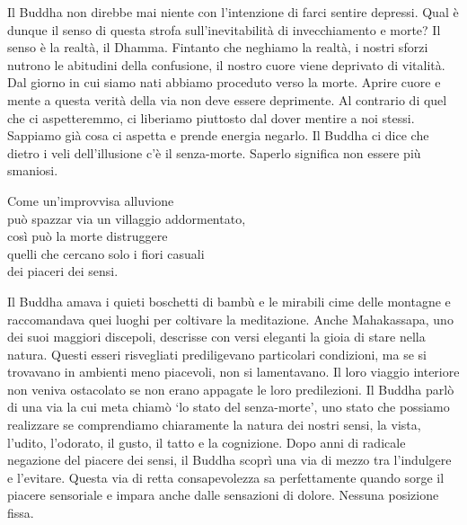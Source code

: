 \begin{dhpRefl}
Il Buddha non direbbe mai niente con l'intenzione di farci sentire depressi. Qual \`{e} dunque il senso di questa strofa sull'inevitabilit\`{a} di invecchiamento e morte? Il senso \`{e} la realt\`{a}, il Dhamma. Fintanto che neghiamo la realt\`{a}, i nostri sforzi nutrono le abitudini della confusione, il nostro cuore viene deprivato di vitalit\`{a}. Dal giorno in cui siamo nati abbiamo proceduto  verso la morte. Aprire cuore e mente a questa verit\`{a} della via non deve essere deprimente. Al contrario di quel che ci aspetteremmo,  ci liberiamo piuttosto dal dover mentire a noi stessi. Sappiamo gi\`{a} cosa ci aspetta e prende energia negarlo. Il Buddha ci dice che dietro i veli dell'illusione c'\`{e} il senza-morte. Saperlo significa non essere più smaniosi.
\end{dhpRefl}


\begin{dhpVerse}{47}
\label{dhp-47}
Come un'improvvisa alluvione\\
pu\`{o} spazzar via un villaggio addormentato,\\
così pu\`{o} la morte distruggere\\
quelli che cercano solo i fiori casuali\\
dei piaceri dei sensi.
\end{dhpVerse}

\begin{dhpRefl}
Il Buddha amava i quieti boschetti di bambù e le mirabili cime delle montagne e raccomandava quei luoghi per coltivare la meditazione. Anche Mahakassapa, uno dei suoi maggiori discepoli, descrisse con versi eleganti la gioia di stare nella natura. Questi esseri risvegliati prediligevano particolari condizioni, ma se si trovavano in ambienti meno piacevoli, non si lamentavano. Il loro viaggio interiore non veniva ostacolato se non erano appagate le loro predilezioni. Il Buddha parl\`{o} di una via la cui meta chiam\`{o} `lo stato del senza-morte', uno stato che possiamo realizzare se comprendiamo chiaramente la natura dei nostri sensi, la vista, l'udito, l'odorato, il gusto, il tatto e la cognizione. Dopo anni di radicale negazione del piacere dei sensi, il Buddha scoprì una via di mezzo tra l'indulgere e l'evitare. Questa via di retta consapevolezza sa perfettamente quando sorge il piacere sensoriale e impara anche dalle sensazioni di dolore. Nessuna posizione fissa.
\end{dhpRefl}

